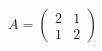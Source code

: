 \documentclass[preview]{standalone}
\begin{document}
\begin{align*}
A = \begin{pmatrix}2 & 1 \\ 1 & 2\end{pmatrix}
\end{align*}
\end{document}
